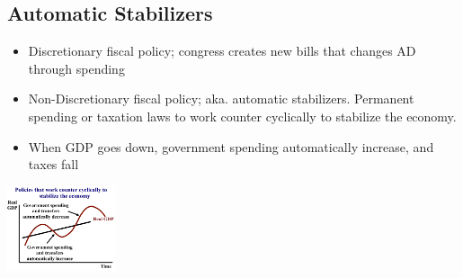 \documentclass[8pt]{beamer}
\begin{document}
  \begin{frame}
	\section{Automatic Stabilizers}
	\begin{itemize}
		\item Discretionary fiscal policy; congress creates new bills that changes
		AD through spending
		\item Non-Discretionary fiscal policy; aka. automatic stabilizers.
		Permanent spending or taxation laws to work counter cyclically to
		stabilize the economy.
		\item When GDP goes down, government spending automatically increase, and taxes fall
	\end{itemize}
	\includegraphics[height=2.5cm]{2021-10-12-12-56-27.png}
  \end{frame}
\end{document}
